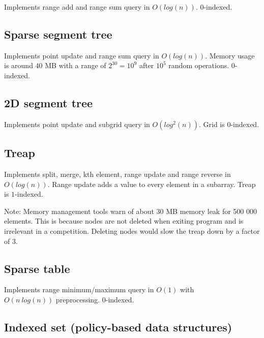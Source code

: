 \documentclass{article}
\begin{document}
Implements range add and range sum query in $O(log(n))$. $0$-indexed.



\subsection {Sparse segment tree}

Implements point update and range sum query in $O(log(n))$. Memory usage is around $40$ MB with a range of $2^{30} = 10^9$ after $10^5$ random operations. $0$-indexed.



\subsection {2D segment tree}

Implements point update and subgrid query in $O(log^2(n))$. Grid is $0$-indexed.



\subsection {Treap}

Implements split, merge, kth element, range update and range reverse in $O(log(n))$. Range update adds a value to every element in a subarray. Treap is $1$-indexed.

Note: Memory management tools warn of about 30 MB memory leak for 500 000 elements. This is because nodes are not deleted when exiting program and is irrelevant in a competition. Deleting nodes would slow the treap down by a factor of 3.



\subsection {Sparse table}

Implements range minimum/maximum query in $O(1)$ with \\ $O(n \ log(n))$ preprocessing. $0$-indexed.



\subsection {Indexed set (policy-based data structures)}
\end{document}
